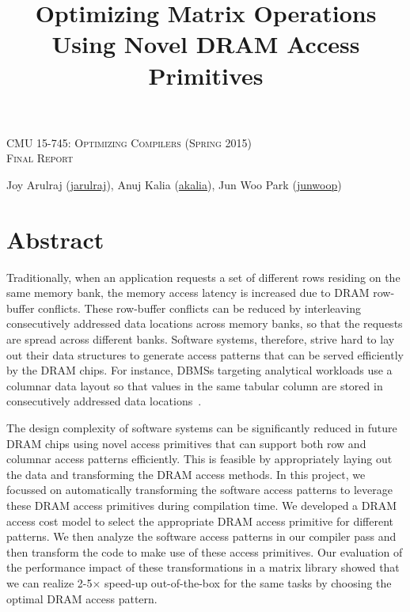 \documentclass[letterpaper]{article}
\makeatletter
\newcommand{\email}[1]{\href{mailto:#1@cs.cmu.edu}{#1}}
\makeatother
\begin{document}
\title{Optimizing Matrix Operations Using Novel DRAM
  Access Primitives}
 \author{}
\date{}
\maketitle
\begin{center}
  \textsc{\large CMU 15-745: Optimizing Compilers (Spring 2015)} \\
  \vspace{1em}
  \textsc{\large Final Report} \\
  \vspace{1em}
  \centerline{\large{Joy Arulraj (\email{jarulraj}), Anuj Kalia
    (\email{akalia})}, Jun Woo Park (\email{junwoop}) }
  \vspace{1em}
\end{center}

\section{Abstract}

Traditionally, when an application requests a set of different rows
residing on the same memory bank, the memory access latency is
increased due to DRAM row-buffer conflicts.
These row-buffer conflicts can be reduced by interleaving
consecutively addressed data locations across memory banks, so that
the requests are spread across different banks.
Software systems, therefore, strive hard to lay out their data structures
to generate access patterns that can be served efficiently by
the DRAM chips.
For instance, DBMSs targeting analytical workloads use a columnar data
layout so that values in the same tabular column are stored in
consecutively addressed data locations~\cite{col1}.

The design complexity of software systems can be significantly
reduced in future DRAM chips using novel access primitives that can
support both row and columnar access patterns efficiently.
This is feasible by appropriately laying out the data and transforming
the DRAM access methods.
In this project, we focussed on automatically
transforming the software access patterns to leverage these
DRAM access primitives during compilation time.
We developed a DRAM access cost model to select the appropriate DRAM
access primitive for different patterns. We then
analyze the software access patterns in our compiler pass and then
transform the code to make use of these access primitives.
Our evaluation of the performance impact of these transformations in
a matrix library showed that we can realize 2-5$\times$ speed-up 
out-of-the-box for the same tasks by choosing the optimal DRAM 
access pattern.
\end{document}
